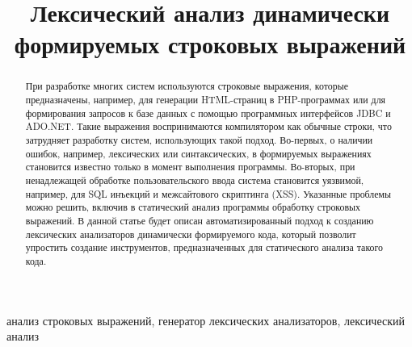 \documentclass[10pt, conference, compsocconf]{IEEEtran}
\begin{document}

\title{Лексический анализ динамически формируемых строковых выражений}

\author{
\and
{}
}

\maketitle


\begin{abstract}
При разработке многих систем используются строковые выражения, которые предназначены, например, для генерации HTML-страниц в PHP-программах или для формирования запросов к базе данных с помощью программных интерфейсов JDBC и ADO.NET. Такие выражения воспринимаются компилятором как обычные строки, что затрудняет разработку систем, использующих такой подход. Во-первых, о наличии ошибок, например, лексических или синтаксических, в формируемых выражениях становится известно только в момент выполнения программы. Во-вторых, при ненадлежащей обработке пользовательского ввода система становится уязвимой, например, для SQL инъекций и межсайтового скриптинга (XSS). Указанные проблемы можно решить, включив в статический анализ программы обработку строковых выражений. В данной статье будет описан автоматизированный подход к созданию лексических анализаторов динамически формируемого кода, который позволит упростить создание инструментов, предназначенных для статического анализа такого кода.
\end{abstract}

\vspace{5 mm}
\begin{IEEEkeywords}
 анализ строковых выражений, генератор лексических анализаторов, лексический анализ
\end{IEEEkeywords}

\IEEEpeerreviewmaketitle
\end{document}
